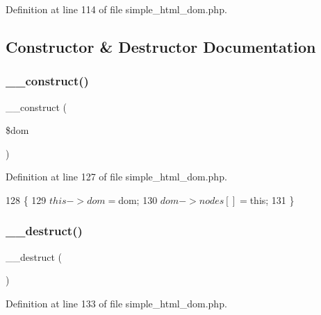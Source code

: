 Definition at line 114 of file simple\+\_\+html\+\_\+dom.\+php.



\subsection{Constructor \& Destructor Documentation}
\hypertarget{classsimple__html__dom__node_aac23fa1150ef19e7f28c0cf2d9e31086}{}\label{classsimple__html__dom__node_aac23fa1150ef19e7f28c0cf2d9e31086} 
\subsubsection{\texorpdfstring{\+\_\+\+\_\+construct()}{\_\_construct()}}
{\footnotesize\ttfamily \+\_\+\+\_\+construct (\begin{DoxyParamCaption}\item[{}]{\$dom }\end{DoxyParamCaption})}



Definition at line 127 of file simple\+\_\+html\+\_\+dom.\+php.


\begin{DoxyCode}
128     \{
129         $this->dom = $dom;
130         $dom->nodes[] = $this;
131     \}
\end{DoxyCode}
\hypertarget{classsimple__html__dom__node_a421831a265621325e1fdd19aace0c758}{}\label{classsimple__html__dom__node_a421831a265621325e1fdd19aace0c758} 
\subsubsection{\texorpdfstring{\+\_\+\+\_\+destruct()}{\_\_destruct()}}
{\footnotesize\ttfamily \+\_\+\+\_\+destruct (\begin{DoxyParamCaption}{ }\end{DoxyParamCaption})}



Definition at line 133 of file simple\+\_\+html\+\_\+dom.\+php.



